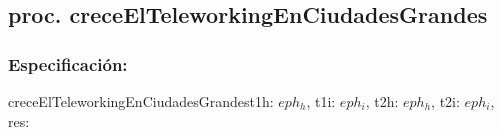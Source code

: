 \documentclass[a4paper]{article}
\begin{document}
\pagebreak
\subsection{proc. creceElTeleworkingEnCiudadesGrandes}

    \subsubsection{Especificaci\'on:}
        \begin{proc}{creceElTeleworkingEnCiudadesGrandes}{\In t1h: $eph_{h}$, \In t1i: $eph_{i}$, \In t2h: $eph_{h}$, \In t2i: $eph_{i}$, \Out res: \bool}{}
        \end{proc}
\end{document}
